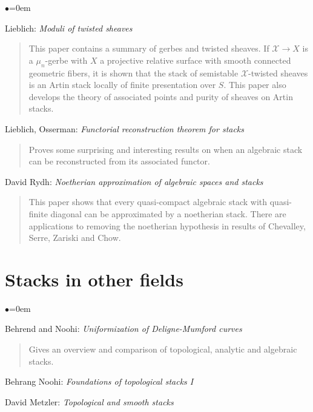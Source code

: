 \begin{list}{$\bullet$}{\leftmargin=0em}
\item Lieblich: \emph{Moduli of twisted sheaves} \cite{lieblich_twisted}
\begin{quote}
This paper contains a summary of gerbes and twisted sheaves.
If $\mathcal{X} \rightarrow X$ is a $\mu_n$-gerbe with $X$ a projective
relative surface with smooth connected geometric fibers, it is shown that
the stack of semistable $\mathcal{X}$-twisted sheaves is an Artin stack
locally of finite presentation over $S$.  This paper also develops the
theory of associated points and purity of sheaves on Artin stacks.
\end{quote}
\smallskip
\item Lieblich, Osserman:
\emph{Functorial reconstruction theorem for stacks}
\cite{lieblich-osserman}
\begin{quote}
Proves some surprising and interesting results on
when an algebraic stack can be reconstructed from its associated functor.
\end{quote}
\smallskip
\item David Rydh:
\emph{Noetherian approximation of algebraic spaces and stacks}
\cite{rydh_approx}
\begin{quote}
This paper shows that every quasi-compact algebraic stack
with quasi-finite diagonal can be approximated by a noetherian stack.
There are applications to removing the noetherian hypothesis in results
of Chevalley, Serre, Zariski and Chow.
\end{quote}
\end{list}



\section{Stacks in other fields}
\label{section-stacks-areas}

\begin{list}{$\bullet$}{\leftmargin=0em}
\item Behrend and Noohi: \emph{Uniformization of Deligne-Mumford curves}
\cite{behrend-noohi}
\begin{quote}
Gives an overview and comparison of topological, analytic and algebraic stacks.
\end{quote}
\smallskip

\item Behrang Noohi: \emph{Foundations of topological stacks I} \cite{noohi}
\smallskip
\item David Metzler: \emph{Topological and smooth stacks} \cite{metzler}
\end{list}


